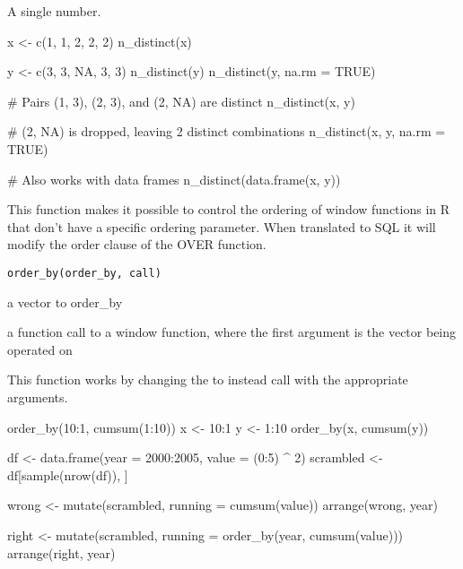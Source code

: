 \documentclass[a4paper]{book}
\begin{document}
%
\begin{Value}
A single number.
\end{Value}
%
\begin{Examples}
\begin{ExampleCode}
x <- c(1, 1, 2, 2, 2)
n_distinct(x)

y <- c(3, 3, NA, 3, 3)
n_distinct(y)
n_distinct(y, na.rm = TRUE)

# Pairs (1, 3), (2, 3), and (2, NA) are distinct
n_distinct(x, y)

# (2, NA) is dropped, leaving 2 distinct combinations
n_distinct(x, y, na.rm = TRUE)

# Also works with data frames
n_distinct(data.frame(x, y))
\end{ExampleCode}
\end{Examples}
%
\begin{Description}
This function makes it possible to control the ordering of window functions
in R that don't have a specific ordering parameter. When translated to SQL
it will modify the order clause of the OVER function.
\end{Description}
%
\begin{Usage}
\begin{verbatim}
order_by(order_by, call)
\end{verbatim}
\end{Usage}
%
\begin{Arguments}
\begin{ldescription}
\item[\code{order\_by}] a vector to order\_by

\item[\code{call}] a function call to a window function, where the first argument
is the vector being operated on
\end{ldescription}
\end{Arguments}
%
\begin{Details}
This function works by changing the  to instead call
 with the appropriate arguments.
\end{Details}
%
\begin{Examples}
\begin{ExampleCode}
order_by(10:1, cumsum(1:10))
x <- 10:1
y <- 1:10
order_by(x, cumsum(y))

df <- data.frame(year = 2000:2005, value = (0:5) ^ 2)
scrambled <- df[sample(nrow(df)), ]

wrong <- mutate(scrambled, running = cumsum(value))
arrange(wrong, year)

right <- mutate(scrambled, running = order_by(year, cumsum(value)))
arrange(right, year)
\end{ExampleCode}
\end{Examples}
\end{document}
